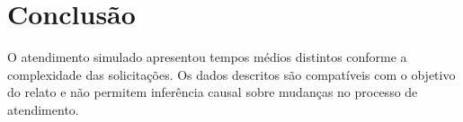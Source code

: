 \section{Conclusão}
O atendimento simulado apresentou tempos médios distintos conforme a complexidade das solicitações.
Os dados descritos são compatíveis com o objetivo do relato e não permitem inferência causal sobre mudanças no processo de atendimento.
